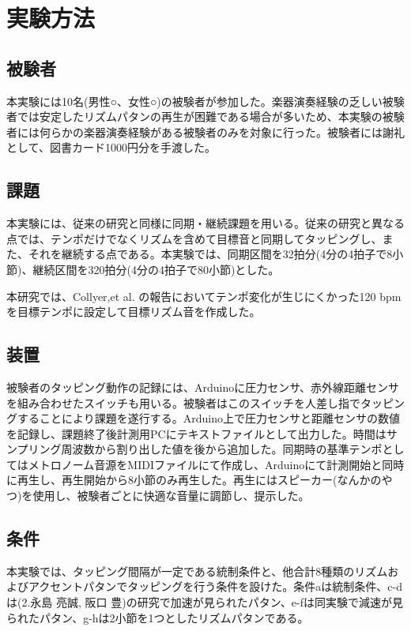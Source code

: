 \documentclass[twocolumn,10pt]{jarticle}
\begin{document}
\section{実験方法}
\subsection{被験者}
本実験には10名(男性○、女性○)の被験者が参加した。楽器演奏経験の乏しい被験者では安定したリズムパタンの再生が困難である場合が多いため、本実験の被験者には何らかの楽器演奏経験がある被験者のみを対象に行った。被験者には謝礼として、図書カード1000円分を手渡した。

\subsection{課題}
本実験には、従来の研究と同様に同期・継続課題を用いる。従来の研究と異なる点では、テンポだけでなくリズムを含めて目標音と同期してタッピングし、また、それを継続する点である。本実験では、同期区間を32拍分(4分の4拍子で8小節)、継続区間を320拍分(4分の4拍子で80小節)とした。

本研究では、Collyer,et al. の報告\cite{Collyer}においてテンポ変化が生じにくかった120 bpmを目標テンポに設定して目標リズム音を作成した。

\subsection{装置}
被験者のタッピング動作の記録には、Arduinoに圧力センサ、赤外線距離センサを組み合わせたスイッチも用いる。被験者はこのスイッチを人差し指でタッピングすることにより課題を遂行する。Arduino上で圧力センサと距離センサの数値を記録し、課題終了後計測用PCにテキストファイルとして出力した。時間はサンプリング周波数から割り出した値を後から追加した。同期時の基準テンポとしてはメトロノーム音源をMIDIファイルにて作成し、Arduinoにて計測開始と同時に再生し、再生開始から8小節のみ再生した。再生にはスピーカー(なんかのやつ)を使用し、被験者ごとに快適な音量に調節し、提示した。

\subsection{条件}
本実験では、タッピング間隔が一定である統制条件と、他合計8種類のリズムおよびアクセントパタンでタッピングを行う条件を設けた。条件aは統制条件、c-dは(2.永島 亮誠, 阪口 豊)の研究で加速が見られたパタン、e-fは同実験で減速が見られたパタン、g-hは2小節を1つとしたリズムパタンである。
\end{document}
